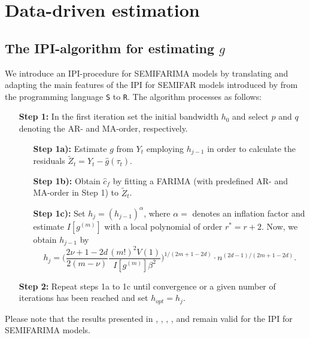 \documentclass[12pt]{article}
\begin{document}
\section{Data-driven estimation}

\subsection{The IPI-algorithm for estimating $g$}

We introduce an IPI-procedure for SEMIFARIMA models by translating and adapting the main features of the IPI for SEMIFAR models introduced by \citet{beran2002iterative} from the programming language \texttt{S} to \texttt{R}. The algorithm processes as follows:


\begin{itemize}
	\item[\textbf{Step 1:}] In the first iteration set the initial bandwidth $h_0$ and select $p$ and $q$ 
	denoting the AR- and MA-order, respectively.	
	\begin{itemize}
		\item [\textbf{Step 1a):}] Estimate $g$ from $Y_t$ employing $h_{j-1}$ in order to calculate the residuals $\tilde{Z}_t = Y_t - \hat{g}(\tau_t)$. 
		
		\item [\textbf{Step 1b):}] Obtain $\hat{c}_f$ by fitting a FARIMA (with predefined AR- and MA-order in Step 1) to  $\tilde{Z}_t$.
		
		\item [\textbf{Step 1c):}] Set $h_j=(h_{j-1})^\alpha$, where $\alpha = $ denotes an 
		inflation factor and estimate $I[g^{(m)}]$ with a local polynomial of order $r^* = r + 2$.   Now, we obtain $h_{j-1}$ by 
		\begin{equation}
			h_j=\Bigg(\frac{2\nu+1-2d}{2(m-\nu)}\frac{(m!)^2V(1)}{I[g^{(m)}]\beta^2}\Bigg)^{1/(2m+1-2d)}\cdot n^{(2d-1)/(2m+1-2d)}.
		\end{equation}
	\end{itemize}
	\item [\textbf{Step 2:}] Repeat steps 1a to 1c until convergence or a given number of iterations has been reached and set $h_{opt} = h_j$.	
\end{itemize}
 


Please note that the results presented in \citet{beran1999semifar}, \citet{beran2001volatility}, \citet{beran2002iterative}, \citet{beran2002local}, \citet{beran2002semifar} and \citet{beran2016long} remain valid for the IPI for SEMIFARIMA models.    
\end{document}
